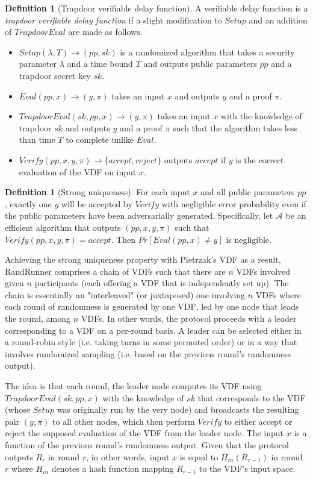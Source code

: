 \documentclass[letterpaper,twocolumn,10pt]{article}
\theoremstyle{definition}
\newtheorem{definition}[theorem]{Definition}
\theoremstyle{remark}
\begin{document}
\begin{definition}[Trapdoor verifiable delay function]
A verifiable delay function is a \textit{trapdoor verifiable delay function} if a slight modification to $Setup$ and an addition of $TrapdoorEval$ are made as follows.
\begin{itemize}
\item $Setup(\lambda, T) \rightarrow (pp, sk)$ is a randomized algorithm that takes a security parameter $\lambda$ and a time bound $T$ and outputs public parameters $pp$ and a trapdoor secret key $sk$.
\item $Eval(pp, x) \rightarrow (y, \pi)$ takes an input $x$ and outputs $y$ and a proof $\pi$.
\item $TrapdoorEval(sk, pp, x) \rightarrow (y, \pi)$ takes an input $x$ with the knowledge of trapdoor $sk$ and outputs $y$ and a proof $\pi$ such that the algorithm takes less than time $T$ to complete unlike $Eval$.
\item $Verify(pp, x, y, \pi) \rightarrow \{accept, reject\}$ outputs $accept$ if $y$ is the correct evaluation of the VDF on input $x$.
\end{itemize}
\end{definition}

\begin{definition}[Strong uniqueness]
For each input $x$ and all public parameters $pp$, exactly one $y$ will be accepted by $Verify$ with negligible error probability even if the public parameters have been adversarially generated. Specifically, let $\mathcal{A}$ be an efficient algorithm that outputs $(pp, x, y, \pi)$ such that $Verify(pp, x, y, \pi) = accept$. Then $Pr[Eval(pp, x) \neq y]$ is negligible.
\end{definition}

Achieving the strong uniqueness property with Pietrzak's VDF as a result, RandRunner comprises a chain of VDFs such that there are $n$ VDFs involved given $n$ participants (each offering a VDF that is independently set up). The chain is essentially an "interleaved" (or juxtaposed) one involving $n$ VDFs where each round of randomness is generated by one VDF, led by one node that leads the round, among $n$ VDFs. In other words, the protocol proceeds with a leader corresponding to a VDF on a per-round basis. A leader can be selected either in a round-robin style (i.e. taking turns in some permuted order) or in a way that involves randomized sampling (i.e. based on the previous round's randomness output).

The idea is that each round, the leader node computes its VDF using $TrapdoorEval(sk, pp, x)$ with the knowledge of $sk$ that corresponds to the VDF (whose $Setup$ was originally run by the very node) and broadcasts the resulting pair $(y, \pi)$ to all other nodes, which then perform $Verify$ to either accept or reject the supposed evaluation of the VDF from the leader node. The input $x$ is a function of the previous round's randomness output. Given that the protocol outputs $R_r$ in round $r$, in other words, input $x$ is equal to $H_{in}(R_{r - 1})$ in round $r$ where $H_{in}$ denotes a hash function mapping $R_{r - 1}$ to the VDF's input space.\\
\end{document}
